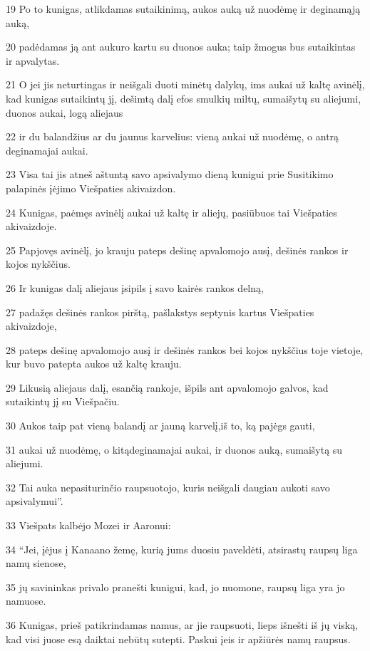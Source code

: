 \par 19 Po to kunigas, atlikdamas sutaikinimą, aukos auką už nuodėmę ir deginamąją auką, 
\par 20 padėdamas ją ant aukuro kartu su duonos auka; taip žmogus bus sutaikintas ir apvalytas. 
\par 21 O jei jis neturtingas ir neišgali duoti minėtų dalykų, ims aukai už kaltę avinėlį, kad kunigas sutaikintų jį, dešimtą dalį efos smulkių miltų, sumaišytų su aliejumi, duonos aukai, logą aliejaus 
\par 22 ir du balandžius ar du jaunus karvelius: vieną aukai už nuodėmę, o antrą deginamajai aukai. 
\par 23 Visa tai jis atneš aštuntą savo apsivalymo dieną kunigui prie Susitikimo palapinės įėjimo Viešpaties akivaizdon. 
\par 24 Kunigas, paėmęs avinėlį aukai už kaltę ir aliejų, pasiūbuos tai Viešpaties akivaizdoje. 
\par 25 Papjovęs avinėlį, jo krauju pateps dešinę apvalomojo ausį, dešinės rankos ir kojos nykščius. 
\par 26 Ir kunigas dalį aliejaus įsipils į savo kairės rankos delną, 
\par 27 padažęs dešinės rankos pirštą, pašlakstys septynis kartus Viešpaties akivaizdoje, 
\par 28 pateps dešinę apvalomojo ausį ir dešinės rankos bei kojos nykščius toje vietoje, kur buvo patepta aukos už kaltę krauju. 
\par 29 Likusią aliejaus dalį, esančią rankoje, išpils ant apvalomojo galvos, kad sutaikintų jį su Viešpačiu. 
\par 30 Aukos taip pat vieną balandį ar jauną karvelį,­iš to, ką pajėgs gauti,­ 
\par 31 aukai už nuodėmę, o kitą­deginamajai aukai, ir duonos auką, sumaišytą su aliejumi. 
\par 32 Tai auka nepasiturinčio raupsuotojo, kuris neišgali daugiau aukoti savo apsivalymui”. 
\par 33 Viešpats kalbėjo Mozei ir Aaronui: 
\par 34 “Jei, įėjus į Kanaano žemę, kurią jums duosiu paveldėti, atsirastų raupsų liga namų sienose, 
\par 35 jų savininkas privalo pranešti kunigui, kad, jo nuomone, raupsų liga yra jo namuose. 
\par 36 Kunigas, prieš patikrindamas namus, ar jie raupsuoti, lieps išnešti iš jų viską, kad visi juose esą daiktai nebūtų sutepti. Paskui įeis ir apžiūrės namų raupsus. 
